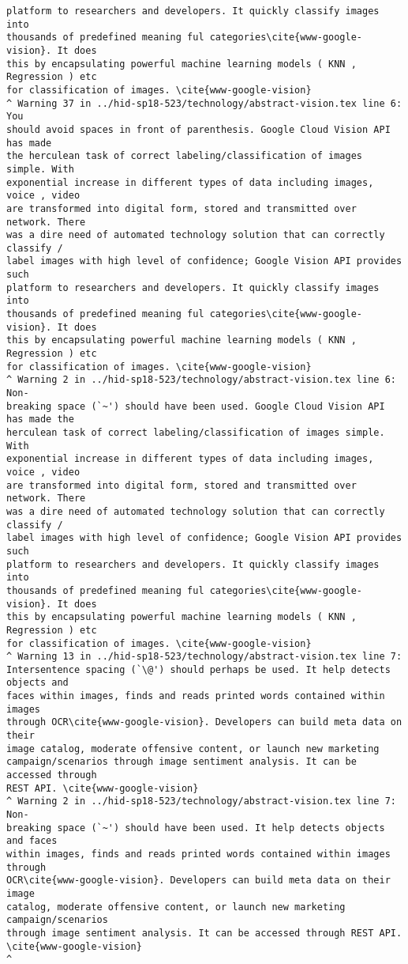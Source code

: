 \begin{IU}
\begin{tiny}
\begin{verbatim}
platform to researchers and developers. It quickly classify images into
thousands of predefined meaning ful categories\cite{www-google-vision}. It does
this by encapsulating powerful machine learning models ( KNN , Regression ) etc
for classification of images. \cite{www-google-vision}
^ Warning 37 in ../hid-sp18-523/technology/abstract-vision.tex line 6: You
should avoid spaces in front of parenthesis. Google Cloud Vision API has made
the herculean task of correct labeling/classification of images simple. With
exponential increase in different types of data including images, voice , video
are transformed into digital form, stored and transmitted over network. There
was a dire need of automated technology solution that can correctly classify /
label images with high level of confidence; Google Vision API provides such
platform to researchers and developers. It quickly classify images into
thousands of predefined meaning ful categories\cite{www-google-vision}. It does
this by encapsulating powerful machine learning models ( KNN , Regression ) etc
for classification of images. \cite{www-google-vision}
^ Warning 2 in ../hid-sp18-523/technology/abstract-vision.tex line 6: Non-
breaking space (`~') should have been used. Google Cloud Vision API has made the
herculean task of correct labeling/classification of images simple. With
exponential increase in different types of data including images, voice , video
are transformed into digital form, stored and transmitted over network. There
was a dire need of automated technology solution that can correctly classify /
label images with high level of confidence; Google Vision API provides such
platform to researchers and developers. It quickly classify images into
thousands of predefined meaning ful categories\cite{www-google-vision}. It does
this by encapsulating powerful machine learning models ( KNN , Regression ) etc
for classification of images. \cite{www-google-vision}
^ Warning 13 in ../hid-sp18-523/technology/abstract-vision.tex line 7:
Intersentence spacing (`\@') should perhaps be used. It help detects objects and
faces within images, finds and reads printed words contained within images
through OCR\cite{www-google-vision}. Developers can build meta data on their
image catalog, moderate offensive content, or launch new marketing
campaign/scenarios through image sentiment analysis. It can be accessed through
REST API. \cite{www-google-vision}
^ Warning 2 in ../hid-sp18-523/technology/abstract-vision.tex line 7: Non-
breaking space (`~') should have been used. It help detects objects and faces
within images, finds and reads printed words contained within images through
OCR\cite{www-google-vision}. Developers can build meta data on their image
catalog, moderate offensive content, or launch new marketing campaign/scenarios
through image sentiment analysis. It can be accessed through REST API.
\cite{www-google-vision}
^
\end{verbatim}
\end{tiny}
\end{IU}


